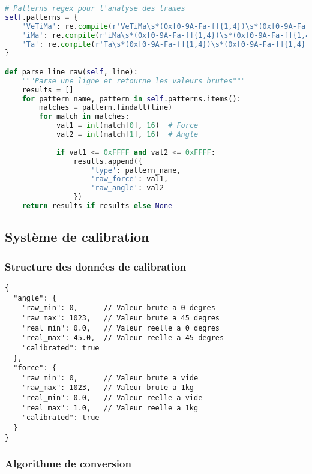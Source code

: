\documentclass[12pt,a4paper]{article}
\begin{document}
\begin{lstlisting}[language=python, caption=Analyse des protocoles série]
# Patterns regex pour l'analyse des trames
self.patterns = {
    'VeTiMa': re.compile(r'VeTiMa\s*(0x[0-9A-Fa-f]{1,4})\s*(0x[0-9A-Fa-f]{1,4})'),
    'iMa': re.compile(r'iMa\s*(0x[0-9A-Fa-f]{1,4})\s*(0x[0-9A-Fa-f]{1,4})'),
    'Ta': re.compile(r'Ta\s*(0x[0-9A-Fa-f]{1,4})\s*(0x[0-9A-Fa-f]{1,4})')
}

def parse_line_raw(self, line):
    """Parse une ligne et retourne les valeurs brutes"""
    results = []
    for pattern_name, pattern in self.patterns.items():
        matches = pattern.findall(line)
        for match in matches:
            val1 = int(match[0], 16)  # Force
            val2 = int(match[1], 16)  # Angle
            
            if val1 <= 0xFFFF and val2 <= 0xFFFF:
                results.append({
                    'type': pattern_name,
                    'raw_force': val1,
                    'raw_angle': val2
                })
    return results if results else None
\end{lstlisting}

\subsection{Système de calibration}

\subsubsection{Structure des données de calibration}

\begin{lstlisting}[caption=Format de calibration]
{
  "angle": {
    "raw_min": 0,      // Valeur brute a 0 degres
    "raw_max": 1023,   // Valeur brute a 45 degres  
    "real_min": 0.0,   // Valeur reelle a 0 degres
    "real_max": 45.0,  // Valeur reelle a 45 degres
    "calibrated": true
  },
  "force": {
    "raw_min": 0,      // Valeur brute a vide
    "raw_max": 1023,   // Valeur brute a 1kg
    "real_min": 0.0,   // Valeur reelle a vide
    "real_max": 1.0,   // Valeur reelle a 1kg
    "calibrated": true
  }
}
\end{lstlisting}

\subsubsection{Algorithme de conversion}
\end{document}
